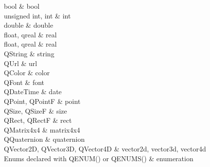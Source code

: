 ﻿




bool
    &
bool
    \\

unsigned int, int
    &
int
    \\

double
    &
double
    \\

float, qreal
    &
real
    \\

float, qreal
    &
real
    \\

QString
    &
string
    \\

QUrl
    &
url
    \\

QColor
    &
color
    \\

QFont
    &
font
    \\    

QDateTime
    &
date
    \\   

QPoint, QPointF
    &
point
    \\  

QSize, QSizeF
    &
size
    \\  

QRect, QRectF
    &
rect
    \\  

QMatrix4x4
    &
matrix4x4
    \\  

QQuaternion
    &
quaternion
    \\      

QVector2D, QVector3D, QVector4D
    &
vector2d, vector3d, vector4d
    \\   

Enums declared with Q\underline{\hspace{0.5em}}ENUM() or Q\underline{\hspace{0.5em}}ENUMS()
    &
enumeration
    \\   












